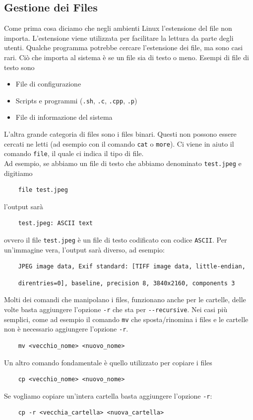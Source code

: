 \documentclass[11pt]{book}
\begin{document}
\subsection{Gestione dei Files}
Come prima cosa diciamo che negli ambienti Linux l'estensione del file non importa. L'estensione viene utilizzata per facilitare la lettura da parte degli utenti. Qualche programma potrebbe cercare l'estensione dei file, ma sono casi rari. Ciò che importa al sistema è se un file sia di testo o meno. Esempi di file di testo sono
\begin{itemize}
	\item File di configurazione
	\item Scripts e programmi (\verb".sh", \verb".c", \verb".cpp", \verb".p")
	\item File di informazione del sistema
\end{itemize}
L'altra grande categoria di files sono i files binari. Questi non possono essere cercati ne letti (ad esempio con il comando \verb"cat" o \verb"more"). Ci viene in aiuto il comando \verb"file", il quale ci indica il tipo di file. \\
Ad esempio, se abbiamo un file di testo che abbiamo denominato \verb"test.jpeg" e digitiamo
\begin{verbatim}
	file test.jpeg
\end{verbatim}
l'output sarà
\begin{verbatim}
	test.jpeg: ASCII text
\end{verbatim}
ovvero il file \verb"test.jpeg" è un file di testo codificato con codice \verb"ASCII". Per un'immagine vera, l'output sarà diverso, ad esempio:
\begin{verbatim}
	JPEG image data, Exif standard: [TIFF image data, little-endian, 
\end{verbatim}
\begin{verbatim}
	direntries=0], baseline, precision 8, 3840x2160, components 3
\end{verbatim}

Molti dei comandi che manipolano i files, funzionano anche per le cartelle, delle volte basta aggiungere l'opzione \verb"-r" che sta per \verb"--recursive". Nei casi più semplici, come ad esempio il comando \verb"mv" che sposta/rinomina i files e le cartelle non è necessario aggiungere l'opzione \verb"-r". 
\begin{verbatim}
	mv <vecchio_nome> <nuovo_nome>
\end{verbatim}

Un altro comando fondamentale è quello utilizzato per copiare i files
\begin{verbatim}
	cp <vecchio_nome> <nuovo_nome>
\end{verbatim}
Se vogliamo copiare un'intera cartella basta aggiungere l'opzione \verb"-r":
\begin{verbatim}
	cp -r <vecchia_cartella> <nuova_cartella>
\end{verbatim}
\end{document}
